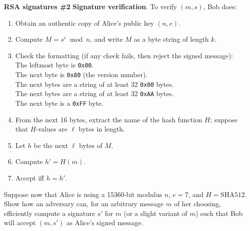 \begin{problem}{\bf RSA signatures \#2}
\noindent
{\bf Signature verification}. To verify $(m,s)$, Bob does:
\begin{enumerate}[label=(\alph*)]
\item Obtain an authentic copy of Alice's public key $(n,e)$.
\item Compute $M = s^e \bmod{n}$, and write $M$ as a byte string of length $k$.
\item Check the formatting (if any check fails, then reject the signed
message):\\
\hspace*{10mm}The leftmost byte is \texttt{0x00}.\\
\hspace*{10mm}The next byte is \texttt{0x80} (the version number).\\
\hspace*{10mm}The next bytes are a string of at least 32 \texttt{0x00} bytes.\\
\hspace*{10mm}The next bytes are a string of at least 32 \texttt{0xAA} bytes.\\
\hspace*{10mm}The next byte is a \texttt{0xFF} byte.
\item From the next 16 bytes, extract the name of the hash function $H$;
suppose that $H$-values are $\ell$ bytes in length.
\item Let $h$ be the next $\ell$ bytes of $M$.
\item Compute $h' = H(m)$.
\item Accept iff $h=h'$.
\end{enumerate}

Suppose now that Alice is using a 15360-bit modulus $n$, $e=7$, and
$H=\mbox{SHA512}$. Show how an adversary can, for an arbitrary message
$m$ of her choosing, efficiently compute a signature $s'$ for $m$ (or
a slight variant of $m$) such that Bob will accept $(m,s')$ as Alice's
signed message.
\end{problem}

